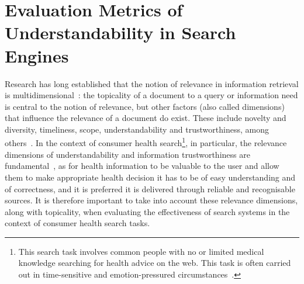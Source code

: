 
\section{Evaluation Metrics of Understandability in Search Engines}
\label{chp:evaluation_metrics}


Research has long established that the notion of relevance in information retrieval is multidimensional~\cite{}: the topicality of a document to a query or information need is central to the notion of relevance, but other factors (also called dimensions) that influence the relevance of a document do exist. These include novelty and diversity, timeliness, scope, understandability and trustworthiness, among others~\cite{park93,schamber94}. In the context of consumer health search\footnote{This search task involves common people with no or limited medical knowledge searching for health advice on the web. This task is often carried out in time-sensitive and emotion-pressured circumstances~\cite{}.}, in particular, the relevance dimensions of understandability and information trustworthiness are fundamental~\cite{hersh08}, as for health information to be valuable to the user and allow them to make appropriate health decision it has to be of easy understanding and of correctness, and it is preferred it is delivered through reliable and recognisable sources. It is therefore important to take into account these relevance dimensions, along with topicality, when evaluating the effectiveness of search systems in the context of consumer health search tasks.

